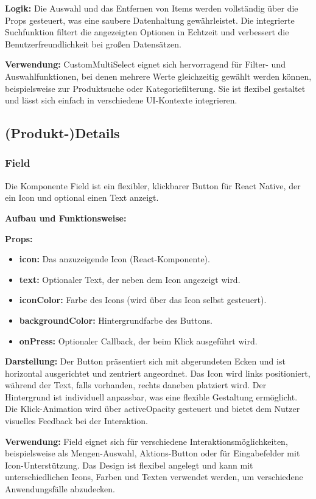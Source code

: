 \textbf{Logik:}
Die Auswahl und das Entfernen von Items werden vollständig über die Props gesteuert, was eine saubere Datenhaltung gewährleistet. Die integrierte Suchfunktion filtert die angezeigten Optionen in Echtzeit und verbessert die Benutzerfreundlichkeit bei großen Datensätzen.

\noindent\textbf{Verwendung:} CustomMultiSelect eignet sich hervorragend für Filter- und Auswahlfunktionen, bei denen mehrere Werte gleichzeitig gewählt werden können, beispielsweise zur Produktsuche oder Kategoriefilterung. Sie ist flexibel gestaltet und lässt sich einfach in verschiedene UI-Kontexte integrieren.

\subsection{(Produkt-)Details}

\subsubsection{Field}
Die Komponente Field ist ein flexibler, klickbarer Button für React Native, der ein Icon und optional einen Text anzeigt.

\noindent\textbf{Aufbau und Funktionsweise:}

\textbf{Props:}
\begin{itemize}
    \item \textbf{icon:} Das anzuzeigende Icon (React-Komponente).
    \item \textbf{text:} Optionaler Text, der neben dem Icon angezeigt wird.
    \item \textbf{iconColor:} Farbe des Icons (wird über das Icon selbst gesteuert).
    \item \textbf{backgroundColor:} Hintergrundfarbe des Buttons.
    \item \textbf{onPress:} Optionaler Callback, der beim Klick ausgeführt wird.
\end{itemize}

\textbf{Darstellung:}
Der Button präsentiert sich mit abgerundeten Ecken und ist horizontal ausgerichtet und zentriert angeordnet. Das Icon wird links positioniert, während der Text, falls vorhanden, rechts daneben platziert wird. Der Hintergrund ist individuell anpassbar, was eine flexible Gestaltung ermöglicht. Die Klick-Animation wird über activeOpacity gesteuert und bietet dem Nutzer visuelles Feedback bei der Interaktion.

\noindent\textbf{Verwendung:} Field eignet sich für verschiedene Interaktionsmöglichkeiten, beispielsweise als Mengen-Auswahl, Aktions-Button oder für Eingabefelder mit Icon-Unterstützung. Das Design ist flexibel angelegt und kann mit unterschiedlichen Icons, Farben und Texten verwendet werden, um verschiedene Anwendungsfälle abzudecken.

